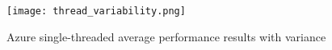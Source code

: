 \documentclass{llncs}
\begin{document}
\begin{table*}[!h]
\begin{adjustbox}{width=\linewidth,center}
\end{adjustbox}
\end{table*}

\begin{figure}[ht]
  \centering
  \texttt{[image: thread\_variability.png]}
  \caption{Azure single-threaded average performance results with variance}
  \label{fig:threadvariability}
\end{figure}
\end{document}
